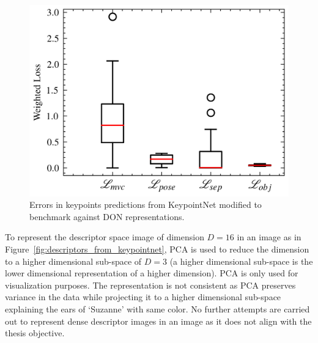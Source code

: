 \begin{figure}[htb]
    \centering
    \caption{Errors in keypoints predictions from KeypointNet modified to benchmark against \ac{DON} representations.}
    \label{fig:increase_loss_in_keypoints}
    \includegraphics[scale=.75]{images/keypointnet/34-D.png}
\end{figure}


To represent
the descriptor space image of dimension $D = 16$ in an image as in Figure~\ref{fig:descriptors_from_keypointnet}, \ac{PCA} is used to reduce
the dimension to a higher dimensional sub-space of $D = 3$ (a higher dimensional sub-space is the lower dimensional representation of a higher dimension).
\ac{PCA} is only used for visualization purposes. The representation is not consistent as \ac{PCA} preserves variance in the data while
projecting it to a higher dimensional sub-space explaining the ears of `Suzanne' with same color.
No further attempts are carried out to represent dense descriptor images in an image as it does not align with the thesis objective.

